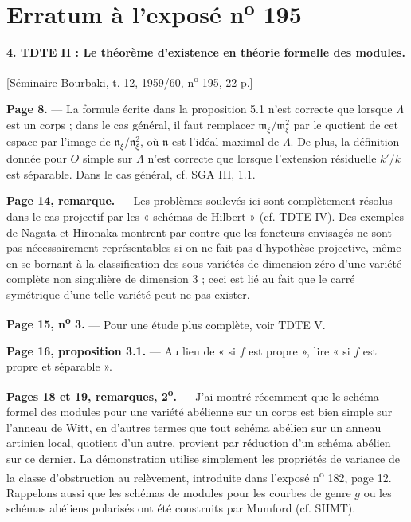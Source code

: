 \clearpage
\chapter*{Erratum à l'exposé n\textsuperscript{o} 195}
\setcounter{footnote}{0}

\noindent\textbf{4. TDTE II : Le théorème d'existence en théorie formelle des
modules.}

\begin{center}
[Séminaire Bourbaki, t. 12, 1959/60, n\textsuperscript{o} 195, 22 p.]
\end{center}

\noindent\textbf{Page 8.} --- La formule écrite dans la proposition 5.1 n'est
correcte que lorsque $\Lambda$ est un corps ; dans le cas général, il faut
remplacer $\mathfrak m_\xi/\mathfrak m_\xi^2$ par le quotient de cet espace par
l'image de $\mathfrak n_\xi/\mathfrak n_\xi^2$, où $\mathfrak n$ est l'idéal
maximal de $\Lambda$. De plus, la définition donnée pour $O$ simple sur
$\Lambda$ n'est correcte que lorsque l'extension résiduelle $k'/k$ est
séparable. Dans le cas général, cf. SGA III, 1.1.

\noindent\textbf{Page 14, remarque.} --- Les problèmes soulevés ici sont
complètement résolus dans le cas projectif par les « schémas de Hilbert »
(cf. TDTE IV). Des exemples de Nagata et Hironaka montrent par contre que les
foncteurs envisagés ne sont pas nécessairement représentables si on ne fait
pas d'hypothèse projective, même en se bornant à la classification des
sous-variétés de dimension zéro d'une variété complète non singulière de
dimension 3 ; ceci est lié au fait que le carré symétrique d'une telle variété
peut ne pas exister.

\noindent\textbf{Page 15, n\textsuperscript{o} 3.} --- Pour une étude plus
complète, voir TDTE V.

\noindent\textbf{Page 16, proposition 3.1.} --- Au lieu de « si $f$ est
propre », lire « si $f$ est propre et séparable ».

\noindent\textbf{Pages 18 et 19, remarques, 2\textsuperscript{o}.} --- J'ai
montré récemment que le schéma formel des modules pour une variété abélienne
sur un corps est bien simple sur l'anneau de Witt, en d'autres termes que tout
schéma abélien sur un anneau artinien local, quotient d'un autre, provient par
réduction d'un schéma abélien sur ce dernier. La démonstration utilise
simplement les propriétés de variance de la classe d'obstruction au relèvement,
introduite dans l'exposé n\textsuperscript{o} 182, page 12. Rappelons aussi que
les schémas de modules pour les courbes de genre $g$ ou les schémas abéliens
polarisés ont été construits par Mumford (cf. SHMT).

